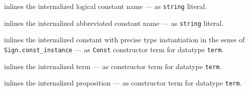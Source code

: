 \begin{isabellebody}
\begin{isamarkuptext}
  \begin{description}

  \item {} inlines the internalized logical
  constant name  --- as \verb|string| literal.

  \item {} inlines the internalized
  abbreviated constant name  --- as \verb|string|
  literal.

  \item {} inlines the internalized
  constant  with precise type instantiation in the sense of
  \verb|Sign.const_instance| --- as \verb|Const| constructor term for
  datatype \verb|term|.

  \item {} inlines the internalized term 
  --- as constructor term for datatype \verb|term|.

  \item {} inlines the internalized proposition
  \isa{{\isasymphi}} --- as constructor term for datatype \verb|term|.


\end{description}
\end{isamarkuptext}
\end{isabellebody}
